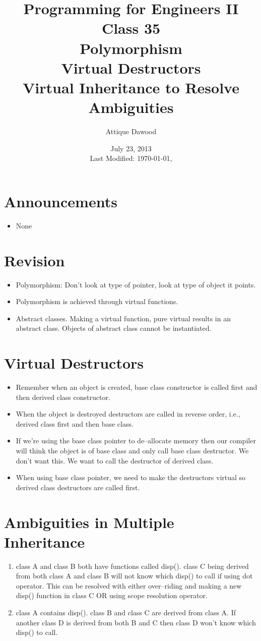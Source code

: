 \documentclass[12pt,a4paper]{article}
\title{\vspace{-2cm}Programming for Engineers II\\Class 35\\Polymorphism\\Virtual Destructors\\Virtual Inheritance to Resolve Ambiguities}
\author{Attique Dawood}
\date{July 23, 2013\\[0.2cm] Last Modified: \today, \currenttime}
\begin{document}
\maketitle
\section{Announcements}
\begin{itemize}
\item None
\end{itemize}
\section{Revision}
\begin{itemize}
\item Polymorphism: Don't look at type of pointer, look at type of object it points.
\item Polymorphism is achieved through virtual functions.
\item Abstract classes. Making a virtual function, pure virtual results in an abstract class. Objects of abstract class cannot be instantiated.
\end{itemize}
\section{Virtual Destructors}
\begin{itemize}
\item Remember when an object is created, base class constructor is called first and then derived class constructor. \item When the object is destroyed destructors are called in reverse order, i.e., derived class first and then base class.
\item If we're using the base class pointer to de--allocate memory then our compiler will think the object is of base class and only call base class destructor. We don't want this. We want to call the destructor of derived class.
\item When using base class pointer, we need to make the destructors virtual so derived class destructors are called first.
\end{itemize}
\section{Ambiguities in Multiple Inheritance}
\begin{enumerate}
\item class A and class B both have functions called disp(). class C being derived from both class A and class B will not know which disp() to call if using dot operator. This can be resolved with either over--riding and making a new disp() function in class C OR using scope resolution operator.
\item class A contains disp(). class B and class C are derived from class A. If another class D is derived from both B and C then class D won't know which disp() to call.
\end{enumerate}
\end{document}
